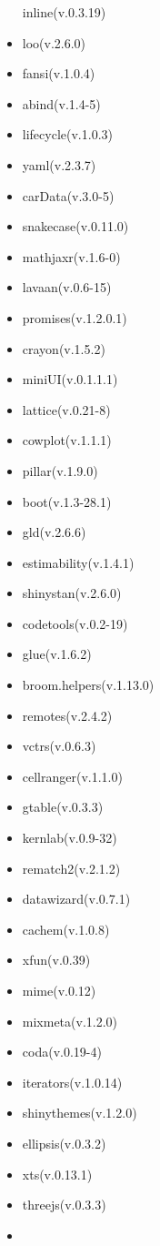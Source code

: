 \documentclass[
]{article}
\begin{document}
\begin{itemize}
  inline(v.0.3.19)
\item
  loo(v.2.6.0)
\item
  fansi(v.1.0.4)
\item
  abind(v.1.4-5)
\item
  lifecycle(v.1.0.3)
\item
  yaml(v.2.3.7)
\item
  carData(v.3.0-5)
\item
  snakecase(v.0.11.0)
\item
  mathjaxr(v.1.6-0)
\item
  lavaan(v.0.6-15)
\item
  promises(v.1.2.0.1)
\item
  crayon(v.1.5.2)
\item
  miniUI(v.0.1.1.1)
\item
  lattice(v.0.21-8)
\item
  cowplot(v.1.1.1)
\item
  pillar(v.1.9.0)
\item
  boot(v.1.3-28.1)
\item
  gld(v.2.6.6)
\item
  estimability(v.1.4.1)
\item
  shinystan(v.2.6.0)
\item
  codetools(v.0.2-19)
\item
  glue(v.1.6.2)
\item
  broom.helpers(v.1.13.0)
\item
  remotes(v.2.4.2)
\item
  vctrs(v.0.6.3)
\item
  cellranger(v.1.1.0)
\item
  gtable(v.0.3.3)
\item
  kernlab(v.0.9-32)
\item
  rematch2(v.2.1.2)
\item
  datawizard(v.0.7.1)
\item
  cachem(v.1.0.8)
\item
  xfun(v.0.39)
\item
  mime(v.0.12)
\item
  mixmeta(v.1.2.0)
\item
  coda(v.0.19-4)
\item
  iterators(v.1.0.14)
\item
  shinythemes(v.1.2.0)
\item
  ellipsis(v.0.3.2)
\item
  xts(v.0.13.1)
\item
  threejs(v.0.3.3)
\item

\end{itemize}
\end{document}
